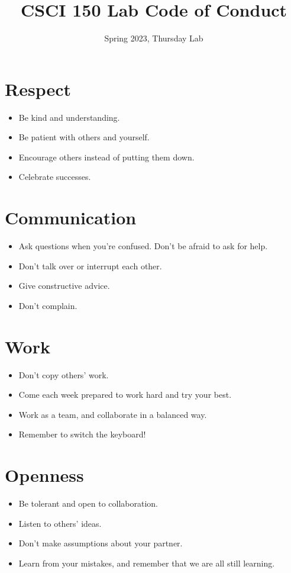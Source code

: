 \documentclass{tufte-handout}
\title{CSCI 150 Lab Code of Conduct}
\date{Spring 2023, Thursday Lab}
\begin{document}
\maketitle

\section{Respect}

\begin{itemize}
\item Be kind and understanding.
\item Be patient with others and yourself.
\item Encourage others instead of putting them down.
\item Celebrate successes.
\end{itemize}

\section{Communication}

\begin{itemize}
\item Ask questions when you're confused.  Don't be afraid to ask for
  help.
\item Don't talk over or interrupt each other.
\item Give constructive advice.
\item Don't complain.
\end{itemize}

\section{Work}

\begin{itemize}
\item Don't copy others' work.
\item Come each week prepared to work hard and try your best.
\item Work as a team, and collaborate in a balanced way.
\item Remember to switch the keyboard!
\end{itemize}

\section{Openness}

\begin{itemize}
\item Be tolerant and open to collaboration.
\item Listen to others' ideas.
\item Don't make assumptions about your partner.
\item Learn from your mistakes, and remember that we are all still
  learning.
\end{itemize}
\end{document}
